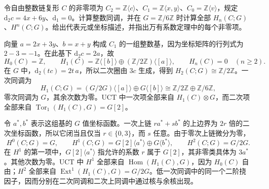 \begin{exercise}\label{g2:ex:coefficient-boundary-matrix}
	令自由整数链复形 \(C\) 的非零项为 \(C_2=\mathbb Z\langle c\rangle\)、\(C_1=\mathbb Z\langle x,y\rangle\)、\(C_0=\mathbb Z\langle v\rangle\)，规定 \(\mathrm{d}_2c=4x+6y\)、\(\mathrm{d}_1=0\)。计算整数同调，并在 \(G=\mathbb Z/6\mathbb Z\) 时计算全部 \(H_n(C;G)\)、\(H^n(C;G)\)。给出代表元或坐标描述，并指出万有系数定理中的每个非零项。
\end{exercise}
\begin{solution}
	向量 \(a=2x+3y\)、\(b=x+y\) 构成 \(C_1\) 的一组整数基，因为坐标矩阵的行列式为 \(2-3=-1\)。在此基下 \(\mathrm{d}_2c=2a\)，故
	\[
		H_0(C)=\mathbb Z,\qquad H_1(C)=\mathbb Z\langle[b]\rangle\oplus(\mathbb Z/2\mathbb Z)\langle[a]\rangle,\qquad H_n(C)=0\quad(n\ge2).
	\]
	在 \(G\) 中，\(\mathrm{d}_2(tc)=2t\,a\)，所以二次圈由 \(3c\) 生成，得到 \(H_2(C;G)\cong\mathbb Z/2\mathbb Z\)。一次同调为
	\[
		H_1(C;G)=(G/2G)\langle[a]\rangle\oplus G\langle[b]\rangle\cong\mathbb Z/2\mathbb Z\oplus\mathbb Z/6\mathbb Z,
	\]
	零次同调为 \(G\)，其余次数为零。UCT 中一次项全部来自 \(H_1(C)\otimes G\)，而二次项全部来自 \(\operatorname{Tor}_1(H_1(C),G)=G[2]\)。

	令 \(a^*,b^*\) 表示这组基的 \(G\) 值坐标函数。一次上链 \(r a^*+s b^*\) 的上边界为 \(2r\) 倍的二次坐标函数，所以它闭当且仅当 \(r\in\{0,3\}\)，而 \(s\) 任意。由于零次上链微分为零，
	\[
		H^0(C;G)=G,\qquad H^1(C;G)=G[2]\langle a^*\rangle\oplus G\langle b^*\rangle,\qquad H^2(C;G)=G/2G.
	\]
	在 \(H^1\) 的第一项中，\(G[2]\langle a^*\rangle\) 指允许的系数 \(r\) 属于 \(G[2]\)，其非零类具体为 \(3a^*\)。其他次数为零。UCT 中 \(H^1\) 全部来自 \(\operatorname{Hom}(H_1(C),G)\)，因为 \(H_0(C)\) 自由；\(H^2\) 全部来自 \(\operatorname{Ext}^1(H_1(C),G)=G/2G\)。低一次同调中的同一个二阶挠因子，因而分别在二次同调和二次上同调中通过核与余核出现。
\end{solution}

